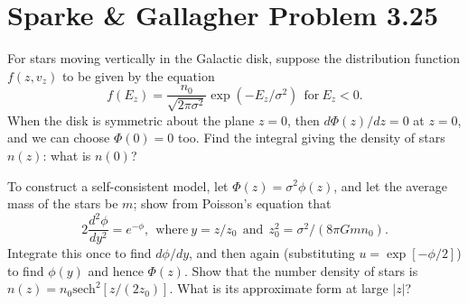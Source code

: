 \documentclass[]{article}
\begin{document}
\section{Sparke \& Gallagher Problem 3.25}

For stars moving vertically in the Galactic disk, suppose the distribution function $f(z,v_z)$ to be given by the equation
\begin{equation}
f(E_z) = \frac{n_0}{\sqrt{2\pi\sigma^2}} \exp\left(-E_z/\sigma^2\right)~~\mathrm{for}~E_z<0.
\end{equation}
\noindent
When the disk is symmetric about the plane $z=0$, then $d\Phi(z)/dz=0$ at $z=0$, and we can choose $\Phi(0)=0$ too. Find the integral giving the density of stars $n(z)$: what is $n(0)$?

To construct a self-consistent model, let $\Phi(z)=\sigma^{2}\phi(z)$, and let the average mass of the stars be $m$; show from Poisson's equation that
\begin{equation}
2\frac{d^2\phi}{dy^2} = e^{-\phi},~~\mathrm{where}~y=z/z_0~~\mathrm{and}~~z_0^2 = \sigma^2/(8\pi G m n_0).
\end{equation}
\noindent
Integrate this once to find $d\phi/dy$, and then again (substituting $u=\exp[-\phi/2]$) to find $\phi(y)$ and hence $\Phi(z)$.
Show that the number density of stars is $n(z) = n_0 \mathrm{sech}^2[z/(2 z_0)]$. What is its approximate form at large $|z|$?
\end{document}
